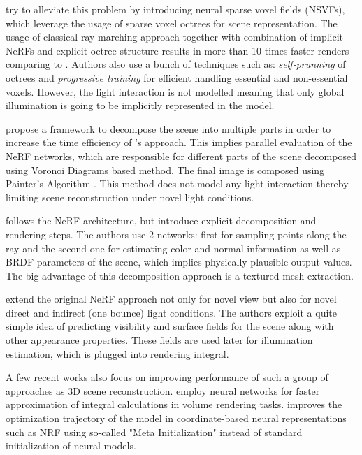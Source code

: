 \documentclass[english]{article}
\begin{document}
\cite{nsvf2020} try to alleviate this problem by introducing neural sparse voxel fields (NSVFs), which leverage the usage of sparse voxel octrees for scene representation. The usage of classical ray marching approach together with combination of implicit NeRFs and explicit octree structure results in more than 10 times faster renders comparing to \cite{nerf2020mildenhall}. Authors also use a bunch of techniques such as: \textit{self-prunning} of octrees and \textit{progressive training} for efficient handling essential and non-essential voxels. However, the light interaction is not modelled meaning that only global illumination is going to be implicitly represented in the model.

\cite{rebain2020derf} propose a framework to decompose the scene into multiple parts in order to increase the time efficiency of \cite{nerf2020mildenhall}'s approach. This implies parallel evaluation of the NeRF networks, which are responsible for different parts of the scene decomposed using Voronoi Diagrams \cite{aurenhammer1991voronoi} based method. The final image is composed using Painter's Algorithm \cite{Newell1972ANA}. This method does not model any light interaction thereby limiting scene reconstruction under novel light conditions.

\cite{boss2020nerd} follows the NeRF architecture, but introduce explicit decomposition and rendering steps. The authors use 2 networks: first for sampling points along the ray and the second one for estimating color and normal information as well as BRDF parameters of the scene, which implies physically plausible output values. The big advantage of this decomposition approach is a textured mesh extraction.

\cite{srinivasan2020nerv} extend the original NeRF approach not only for novel view but also for novel direct and indirect (one bounce) light conditions. The authors exploit a quite simple idea of predicting visibility and surface fields for the scene along with other appearance properties. These fields are used later for illumination estimation, which is plugged into rendering integral.

A few recent works also focus on improving performance of such a group of approaches as 3D scene reconstruction. \cite{lindell2020autoint} employ neural networks for faster approximation of integral calculations in volume rendering tasks. \cite{tancik2020meta} improves the optimization trajectory of the model in coordinate-based neural representations such as NRF using so-called "Meta Initialization" instead of standard initialization of neural models.
\end{document}
